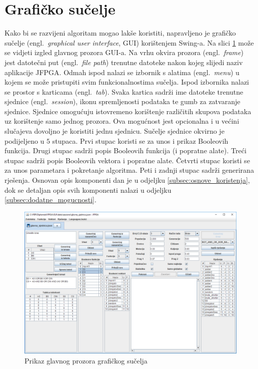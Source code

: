 \documentclass[times, utf8, diplomski]{fer}
\begin{document}

\section{Grafičko sučelje} \label{sec:gui}

Kako bi se razvijeni algoritam mogao lakše koristiti, napravljeno je grafičko sučelje (engl.~\textit{graphical user interface}, GUI) korištenjem Swing-a. Na slici \ref{fig:gui} može se vidjeti izgled glavnog prozora GUI-a. Na vrhu okvira prozora (engl.~\textit{frame}) jest datotečni put (engl.~\textit{file path}) trenutne datoteke nakon kojeg slijedi naziv aplikacije JFPGA. Odmah ispod nalazi se izbornik s alatima (engl.~\textit{menu}) u kojem se može pristupiti svim funkcionalnostima sučelja. Ispod izbornika nalazi se prostor s karticama (engl.~\textit{tab}). Svaka kartica sadrži ime datoteke trenutne sjednice (engl.~\textit{session}), ikonu spremljenosti podataka te gumb za zatvaranje sjednice. Sjednice omogućuju istovremeno korištenje različitih skupova podataka uz korištenje samo jednog prozora. Ova mogućnost jest opcionalna i u većini slučajeva dovoljno je koristiti jednu sjednicu. Sučelje sjednice okvirno je podijeljeno u $5$ stupaca. Prvi stupac koristi se za unos i prikaz Booleovih funkcija. Drugi stupac sadrži popis Booleovih funkcija (i popratne alate). Treći stupac sadrži popis Booleovih vektora i popratne alate. Četvrti stupac koristi se za unos parametara i pokretanje algoritma. Peti i zadnji stupac sadrži generirana rješenja. Osnovan opis komponenti dan je u odjeljku \ref{subsec:osnove_koristenja}, dok se detaljan opis svih komponenti nalazi u odjeljku \ref{subsec:dodatne_mogucnosti}.

\begin{figure}[htb]
	\centering
	\includegraphics[width=1.0\textwidth]{img/GUI.png}
	\caption{Prikaz glavnog prozora grafičkog sučelja}
	\label{fig:gui}
\end{figure}
\end{document}

